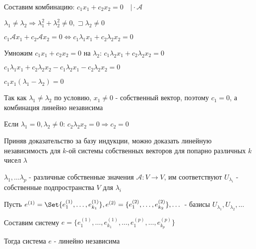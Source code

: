 \documentclass[12pt]{article}
\begin{document}
    \begin{MyProof}
        Составим комбинацию: $c_1 x_1 + c_2 x_2 = 0 \quad \Big| \cdot \mathcal{A}$

        $\lambda_1 \neq \lambda_2 \Longrightarrow \lambda_1^2 + \lambda_2^2 \neq 0, \sqsupset \lambda_2 \neq 0$

        $c_1 \mathcal{A} x_1 + c_2 \mathcal{A} x_2 = 0 \Longleftrightarrow c_1 \lambda_1 x_1 + c_2 \lambda_2 x_2 = 0$

        Умножим $c_1 x_1 + c_2 x_2 = 0$ на $\lambda_2$: $c_1 \lambda_2 x_1 + c_2 \lambda_2 x_2 = 0$

        $c_1 \lambda_1 x_1 + c_2 \lambda_2 x_2 - c_1 \lambda_2 x_1 - c_2 \lambda_2 x_2 = 0$

        $c_1 x_1(\lambda_1 - \lambda_2) = 0$

        Так как $\lambda_1 \neq \lambda_2$ по условию, $x_1 \neq 0$ - собственный вектор, поэтому $c_1 = 0$, а комбинация линейно независима

        Если $\lambda_1 = 0, \lambda_2 \neq 0$: $c_2 \lambda_2 x_2 = 0 \Longrightarrow c_2 = 0$
    \end{MyProof}

    \Nota Приняв доказательство за базу индукции, можно доказать линейную независимость для $k$-ой системы собственных векторов для попарно различных $k$ чисел $\lambda$


    \begin{MyTheorem}
        \Ths $\lambda_1, \dots \lambda_p$ - различные собственные значения $\mathcal{A} : V \rightarrow V$,
        им соответствуют $U_{\lambda_i}$ - собственные подпространства $V$ для $\lambda_i$

        Пусть $e^{(1)} = \Set{e^{(1)}_1, \dots, e^{(1)}_{k_1}}, e^{(2)} = \{e^{(2)}_1, \dots, e^{(2)}_{k_2}\}, \dots$ -
        базисы $U_{\lambda_1}, U_{\lambda_2}, \dots$

        Составим систему $e = \{e^{(1)}_1, \dots, e^{(1)}_{k_1}, \dots, e^{(p)}_1, \dots, e^{(p)}_{k_p}\}$

        Тогда система $e$ - линейно независима
    \end{MyTheorem}
\end{document}
